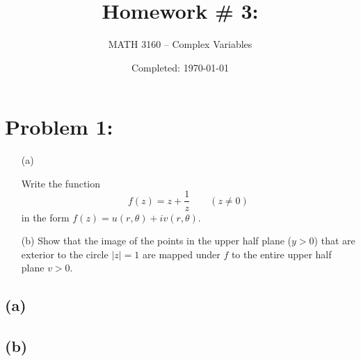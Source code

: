 \documentclass{article}
\title{Homework \# 3: }
\author{
	MATH 3160 -- Complex Variables\\
	\myauthor
}
\date{Completed: \today}
\begin{document}
\maketitle %


\section*{Problem 1: }
\begin{enumerate}
	\item  [(a)]


	      Write the function
	      \[
		      f(z)=z+\frac{1}{z}\qquad (z\neq 0)
	      \]
	      in the form $f(z)=u(r,\theta)+iv(r,\theta)$.

	\item [(b)] Show that the image of the points in the upper half plane ($y>0$) that are exterior to the circle $|z|=1$ are mapped under $f$ to the entire upper half plane $v>0$.
\end{enumerate}

\subsection*{(a)}

\subsection*{(b)}
  \begin{center}
\begin{minipage}{0.45\textwidth}
    \centering
    
\end{minipage}
\hfill
\begin{minipage}{0.45\textwidth}
    \centering
    
\end{minipage}
\end{center}
\end{document}
